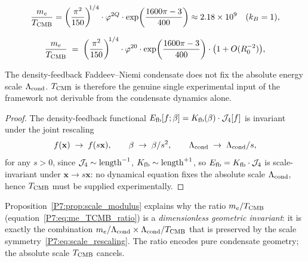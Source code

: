 

\begin{equation}
  \frac{m_e}{T_{\mathrm{CMB}}}
  = \left(\frac{\pi^2}{150}\right)^{\!\!1/4}
    \cdot\varphi^{2Q}\cdot
    \exp\!\left(\frac{1600\pi - 3}{400}\right)
  \approx 2.18\times10^9
  \quad(k_B=1),
  \label{P7:eq:me_TCMB_ratio}
\end{equation}

\begin{equation}
  \frac{m_e}{T_{\mathrm{CMB}}}
  \;=\; \left(\frac{\pi^2}{150}\right)^{\!1/4}
        \cdot\varphi^{20}\cdot
        \exp\!\left(\frac{1600\pi-3}{400}\right)
        \cdot\bigl(1 + O(R_0^{-2})\bigr),
  \label{P7:eq:me_TCMB_ratio_corrected}
\end{equation}

\begin{proposition}
\label{P7:prop:scale_modulus}
The density-feedback Faddeev--Niemi condensate does not fix the absolute
energy scale $\Lambda_{\mathrm{cond}}$.  $T_{\mathrm{CMB}}$ is therefore the genuine single
experimental input of the framework not derivable from the condensate
dynamics alone.
\end{proposition}
\begin{proof}
The density-feedback functional $E_{\mathrm{fb}}[f;\beta]=K_{\mathrm{fb}}(\beta)\cdot\mathcal{J}_4[f]$
is invariant under the joint rescaling
\begin{equation}
  f(\mathbf{x}) \;\to\; f(s\mathbf{x}),
  \qquad
  \beta \;\to\; \beta/s^2,
  \qquad
  \Lambda_{\mathrm{cond}} \;\to\; \Lambda_{\mathrm{cond}}/s,
  \label{P7:eq:scale_rescaling}
\end{equation}
for any $s>0$, since $\mathcal{J}_4\sim\mathrm{length}^{-1}$,
$K_{\mathrm{fb}}\sim\mathrm{length}^{+1}$, so $E_{\mathrm{fb}}=K_{\mathrm{fb}}\cdot\mathcal{J}_4$ is
scale-invariant under $\mathbf{x}\to s\mathbf{x}$: no dynamical
equation fixes the absolute scale $\Lambda_{\mathrm{cond}}$, hence $T_{\mathrm{CMB}}$ must be
supplied experimentally.
\end{proof}

\begin{remark}
\label{P7:rem:me_tcmb_invariance}
Proposition~\ref{P7:prop:scale_modulus} explains why the ratio
$m_e/T_{\mathrm{CMB}}$ (equation~\eqref{P7:eq:me_TCMB_ratio}) is a
\emph{dimensionless geometric invariant}: it is exactly the
combination $m_e/\Lambda_{\mathrm{cond}} \times \Lambda_{\mathrm{cond}}/T_{\mathrm{CMB}}$ that is preserved by
the scale symmetry~\eqref{P7:eq:scale_rescaling}.
The ratio encodes pure condensate geometry; the absolute scale
$T_{\mathrm{CMB}}$ cancels.
\end{remark}

